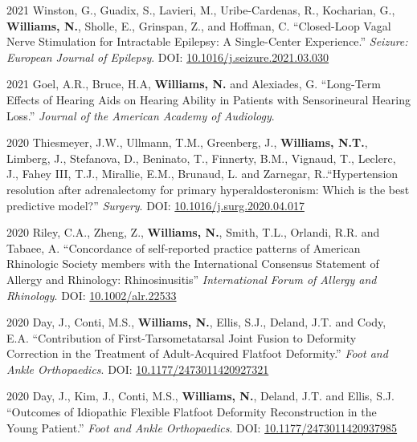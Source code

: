 \documentclass[12pt,letterpaper]{report}
\begin{document}
    \begin{tablist}
    
     \item[2021] \tab Winston, G., Guadix, S., Lavieri, M., Uribe-Cardenas, R., Kocharian, G., \textbf{Williams, N.}, Sholle, E., Grinspan, Z., and Hoffman, C. \enquote{Closed-Loop Vagal Nerve Stimulation for Intractable Epilepsy: A Single-Center Experience.} \textit{Seizure: European Journal of Epilepsy}. DOI: \href{https://doi.org/10.1016/j.seizure.2021.03.030}{10.1016/j.seizure.2021.03.030}
    
    \item[2021] \tab Goel, A.R., Bruce, H.A, \textbf{Williams, N.} and Alexiades, G. \enquote{Long-Term Effects of Hearing Aids on Hearing Ability in Patients with Sensorineural Hearing Loss.} \textit{Journal of the American Academy of Audiology}.
    
    \item[2020] \tab Thiesmeyer, J.W., Ullmann, T.M., Greenberg, J., \textbf{Williams, N.T.}, Limberg, J., Stefanova, D., Beninato, T., Finnerty, B.M., Vignaud, T., Leclerc, J., Fahey III, T.J., Mirallie, E.M., Brunaud, L. and Zarnegar, R..\enquote{Hypertension resolution after adrenalectomy for primary hyperaldosteronism: Which is the best predictive model?} \textit{Surgery}. DOI: \href{https://doi.org/10.1016/j.surg.2020.04.017}{10.1016/j.surg.2020.04.017}  
	
	\item[2020] \tab Riley, C.A., Zheng, Z., \textbf{Williams, N.}, Smith, T.L., Orlandi, R.R. and Tabaee, A. \enquote{Concordance of self‐reported practice patterns of American Rhinologic Society members with the International Consensus Statement of Allergy and Rhinology: Rhinosinusitis} \textit{International Forum of Allergy and Rhinology}. DOI: \href{https://doi.org/10.1002/alr.22533}{10.1002/alr.22533} 
	
	\item[2020] \tab Day, J., Conti, M.S., \textbf{Williams, N.}, Ellis, S.J., Deland, J.T. and Cody, E.A. \enquote{Contribution of First-Tarsometatarsal Joint Fusion to Deformity Correction in the Treatment of Adult-Acquired Flatfoot Deformity.} \textit{Foot and Ankle Orthopaedics}. DOI: \href{https://doi.org/10.1177/2473011420927321}{10.1177/2473011420927321}
	
	\item[2020] \tab Day, J., Kim, J., Conti, M.S., \textbf{Williams, N.}, Deland, J.T. and Ellis, S.J. \enquote{Outcomes of Idiopathic Flexible Flatfoot Deformity Reconstruction in the Young Patient.} \textit{Foot and Ankle Orthopaedics}. DOI: \href{https://doi.org/10.1177/2473011420937985}{10.1177/2473011420937985}
	

\end{tablist}
\end{document}
